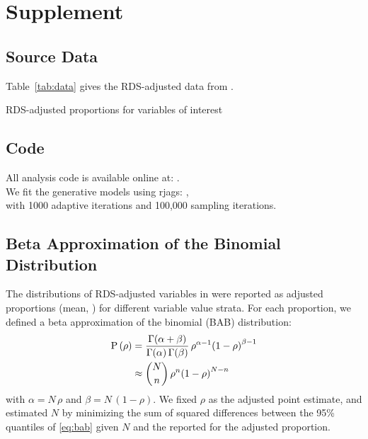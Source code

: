 \section{Supplement}
\subsection{Source Data}\label{app.data}
Table~\ref{tab:data} gives the RDS-adjusted data from \cite{Baral2014}.
\begin{table}[h]
  \centering
  \caption{RDS-adjusted proportions for variables of interest}
  \label{tab:data}
  
\end{table}
\subsection{Code}\label{app.code}
All analysis code is available online at: .\\
We fit the generative models using rjags: ,\\
with 1000 adaptive iterations and 100,000 sampling iterations.
\subsection{Beta Approximation of the Binomial Distribution}\label{app.bab}  
The distributions of RDS-adjusted variables in \cite{Baral2014} were reported as
adjusted proportions (mean, \ci) for different variable value strata.  %
For each proportion, we defined a beta approximation of the binomial (BAB) distribution:
\begin{align}\label{eq:bab}
  \mathrm{P}\,(\rho) &=
    \frac{\Gamma(\alpha+\beta)}{\Gamma(\alpha)\,\Gamma(\beta)}\,
    \rho^{\alpha-1}{(1 - \rho)}^{\beta-1} \\
    &\approx {N \choose n} \, \rho^{n}{(1 - \rho)}^{N - n} \nonumber
\end{align}
with $\alpha = N\,\rho$ and $\beta = N\,(1-\rho)$.
We fixed $\rho$ as the adjusted point estimate,
and estimated $N$ by minimizing the sum of squared differences between
the 95\% quantiles of \eqref{eq:bab} given $N$ and the reported \ci for the adjusted proportion.
